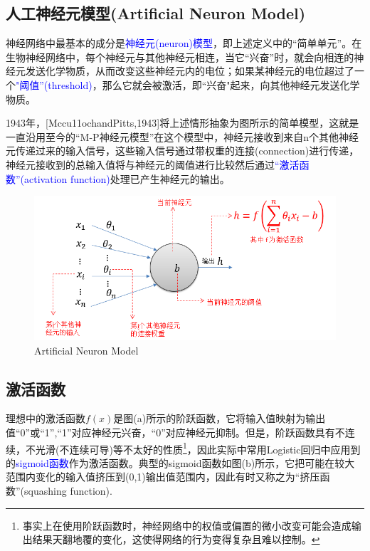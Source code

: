 \subsection{人工神经元模型(Artificial Neuron Model)}

神经网络中最基本的成分是\textcolor{blue}{神经元(neuron)模型}，即上述定义中的“简单单元”。在生物神经网络中，每个神经元与其他神经元相连，当它“兴奋”时，就会向相连的神经元发送化学物质，从而改变这些神经元内的电位；如果某神经元的电位超过了一个\textcolor{blue}{"阈值”(threshold)}，那么它就会被激活，即“兴奋"起来，向其他神经元发送化学物质。

1943年，[Mccu11ochandPitts,1943]将上述情形抽象为图所示的简单模型，这就是一直沿用至今的“M-P神经元模型”在这个模型中，神经元接收到来自n个其他神经元传递过来的输入信号，这些输入信号通过带权重的连接(connection)进行传递，神经元接收到的总输入值将与神经元的阈值进行比较然后通过\textcolor{blue}{“激活函数”(activation function)}处理已产生神经元的输出。

\begin{figure}[h]
\small
\centering
\includegraphics[width=14cm]{figure//3.png}
\caption{Artificial Neuron Model} \label{fig:3}
\end{figure}

\subsection*{激活函数}
理想中的激活函数$f(x)$是图(a)所示的阶跃函数，它将输入值映射为输出值“0”或“1”,“1”对应神经元兴奋，“0”对应神经元抑制。但是，阶跃函数具有不连续，不光滑(不连续可导)等不太好的性质\footnote{事实上在使用阶跃函数时，神经网络中的权值或偏置的微小改变可能会造成输出结果天翻地覆的变化，这使得网络的行为变得复杂且难以控制。}，因此实际中常用Logistic回归中应用到的\textcolor{blue}{sigmoid函数}作为激活函数。典型的sigmoid函数如图(b)所示，它把可能在较大范围内变化的输入值挤压到(0,1)输出值范围内，因此有时又称之为“挤压函数”(squashing function).


